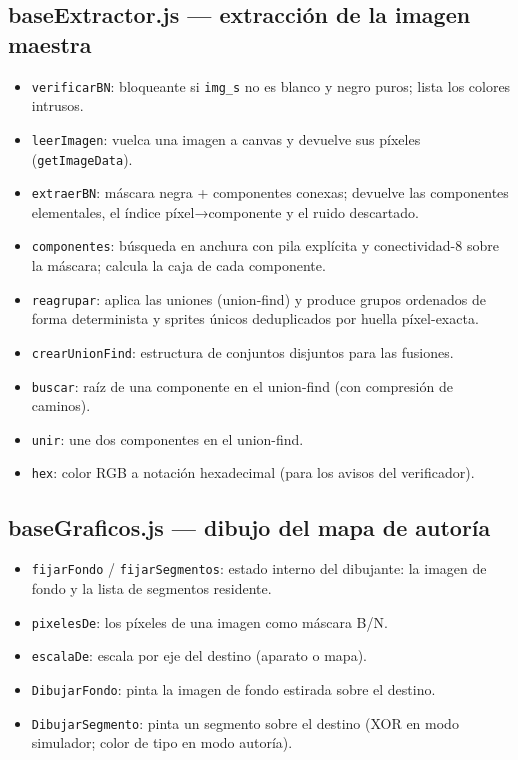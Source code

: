 \documentclass[../main.tex]{subfiles}
\begin{document}
	\subsection*{baseExtractor.js — extracción de la imagen maestra}
	
	\begin{itemize}
		\item \texttt{verificarBN}: bloqueante si \texttt{img\_s} no es
		blanco y negro puros; lista los colores intrusos.
		\item \texttt{leerImagen}: vuelca una imagen a canvas y devuelve
		sus píxeles (\texttt{getImageData}).
		\item \texttt{extraerBN}: máscara negra + componentes conexas;
		devuelve las componentes elementales, el índice píxel→componente y
		el ruido descartado.
		\item \texttt{componentes}: búsqueda en anchura con pila explícita y
		conectividad-8 sobre la máscara; calcula la caja de cada componente.
		\item \texttt{reagrupar}: aplica las uniones (union-find) y produce
		grupos ordenados de forma determinista y sprites únicos
		deduplicados por huella píxel-exacta.
		\item \texttt{crearUnionFind}: estructura de conjuntos disjuntos
		para las fusiones.
		\item \texttt{buscar}: raíz de una componente en el union-find
		(con compresión de caminos).
		\item \texttt{unir}: une dos componentes en el union-find.
		\item \texttt{hex}: color RGB a notación hexadecimal (para los
		avisos del verificador).
	\end{itemize}
	
	\subsection*{baseGraficos.js — dibujo del mapa de autoría}
	
	\begin{itemize}
		\item \texttt{fijarFondo} / \texttt{fijarSegmentos}: estado interno
		del dibujante: la imagen de fondo y la lista de segmentos residente.
		\item \texttt{pixelesDe}: los píxeles de una imagen como máscara
		B/N.
		\item \texttt{escalaDe}: escala por eje del destino (aparato o
		mapa).
		\item \texttt{DibujarFondo}: pinta la imagen de fondo estirada sobre
		el destino.
		\item \texttt{DibujarSegmento}: pinta un segmento sobre el destino
		(XOR en modo simulador; color de tipo en modo autoría).
	\end{itemize}
	
\end{document}
